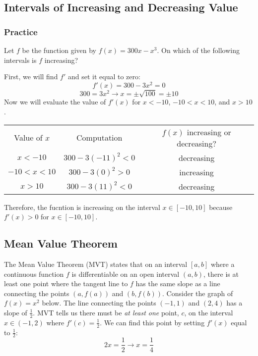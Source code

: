 \subsection{Intervals of Increasing and Decreasing Value}
\subsubsection{Practice}
\begin{Exercise}
    [label=incdec1]
    Let $f$ be the function given by $f(x) = 300x-x^3$. On which of the following intervals is $f$ increasing?
\end{Exercise}
\begin{Answer}
    [ref=incdec1]
    First, we will find $f'$ and set it equal to zero: $$f'(x)=300-3x^2=0$$ $$300=3x^2 \rightarrow x=\pm \sqrt{100} = \pm10$$ Now we will evaluate the value of $f'(x)$ for $x<-10$, $-10<x<10$, and $x>10$. 
    \begin{center}
        \begin{tabular}{c|c|c}
        Value of $x$ & Computation & $f(x)$ increasing or decreasing?\\
         $x<-10$    &  $300-3(-11)^2<0$ & decreasing\\
         $-10<x<10$    & $300-3(0)^2>0 $ & increasing\\
         $x>10$&$300-3(11)^2<0$& decreasing
        \end{tabular}
    \end{center}
    Therefore, the fucntion is increasing on the interval $x \in [-10, 10]$ because $f'(x) >0$ for $x \in [-10, 10]$.
\end{Answer}

\subsection{Mean Value Theorem}

The Mean Value Theorem (MVT) states that on an interval $[a, b]$ where a continuous function $f$ is differentiable on an open interval $(a, b)$, there is at least one point where the tangent line to $f$ has the same slope as a line connecting the points $(a, f(a))$ and $(b, f(b))$. Consider the graph of $f(x) = x^2$ below. The line connecting the points $(-1, 1)$ and $(2, 4)$ has a slope of $\frac{1}{2}$. MVT tells us there must be \textit{at least one} point, $c$, on the interval $x \in (-1, 2)$ where $f'(c) = \frac{1}{2}$. We can find this point by setting $f'(x)$ equal to $\frac{1}{2}$: $$2x=\frac{1}{2} \rightarrow x=\frac{1}{4}$$

